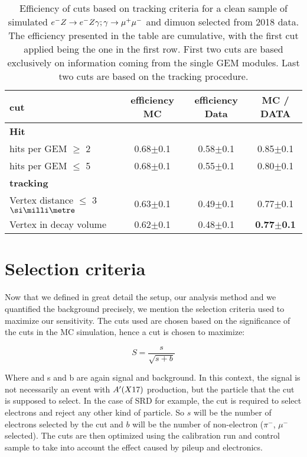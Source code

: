 \begin{center}
\begin{table}
  \begin{tabular}{|l|c|c|c|}
    \hline
    cut & efficiency MC & efficiency Data & MC / DATA \\
    \hline
    \textbf{Hit} & & &\\
    \hline
    hits per GEM $\geq$ 2 & 0.68$\pm$0.1 & 0.58$\pm$0.1 & 0.85$\pm$0.1 \\
    hits per GEM $\leq$ 5 & 0.68$\pm$0.1 & 0.55$\pm$0.1 & 0.80$\pm$0.1 \\
    \hline
    \textbf{tracking} & & &\\
    \hline
    Vertex distance $\leq$ 3 $\mmi$ & 0.63$\pm$0.1 & 0.49$\pm$0.1 & 0.77$\pm$0.1  \\
    Vertex in decay volume & 0.62$\pm$0.1 & 0.48$\pm$0.1 & \textbf{0.77$\pm$0.1}\\
    \hline
    
  \end{tabular}
  \caption[MC/DATA for the tracking procedure and vertex reconstruction]{Efficiency of cuts based on tracking criteria for a clean sample of simulated $e^- Z \to e^- Z \gamma; \gamma \to \mu^+ \mu^-$ and dimuon selected from 2018 data. The efficiency presented in the table are cumulative, with the first cut applied being the one in the first row. First two cuts are based exclusively on information coming from the single GEM modules. Last two cuts are based on the tracking procedure.}
  \label{tab:dimuon:efficiencies}
\end{table}
\end{center}

\section{Selection criteria}
\label{ch3:sec:selection-criteria}

Now that we defined in great detail the setup, our analysis method and we quantified the background precisely, we mention the selection criteria used to maximize our sensitivity. The cuts used are chosen based on the significance of the cuts in the MC simulation, hence a cut is chosen to maximize:

\begin{equation}
  \label{eq:significance}
  S = \frac{s}{\sqrt{s + b}}
\end{equation}

Where and s and b are again signal and background. In this context, the signal is not necessarily an event with $A'(X17)$ production, but the particle that the cut is supposed to select. In the case of SRD for example, the cut is required to select electrons and reject any other kind of particle. So $s$ will be the number of electrons selected by the cut and $b$ will be the number of non-electron ($\pi^-$, $\mu^-$ selected). The cuts are then optimized using the calibration run and control sample to take into account the effect caused by pileup and electronics.

